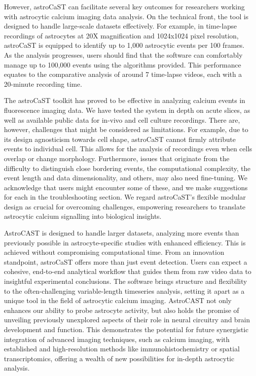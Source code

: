 However, \ac{astroCaST} can facilitate several key outcomes for researchers working with astrocytic calcium imaging data analysis. On the technical front, the tool is designed to handle large-scale datasets effectively. For example, in time-lapse recordings of astrocytes at 20X magnification and 1024x1024 pixel resolution, astroCaST is equipped to identify up to 1,000 astrocytic events per 100 frames. As the analysis progresses, users should find that the software can comfortably manage up to 100,000 events using the algorithms provided. This performance equates to the comparative analysis of around 7 time-lapse videos, each with a 20-minute recording time. 

The astroCaST toolkit has proved to be effective in analyzing calcium events in fluorescence imaging data. We have tested the system in depth on acute slices, as well as available public data for in-vivo and cell culture recordings. There are, however, challenges that might be considered as limitations. For example, due to its design agnosticism towards cell shape, astroCaST cannot firmly attribute events to individual cell. This allows for the analysis of recordings even when cells overlap or change morphology. Furthermore, issues that originate from the difficulty to distinguish close bordering events, the computational complexity, the event length and data dimensionality, and others, may also need fine-tuning. We acknowledge that users might encounter some of these, and we make suggestions for each in the troubleshooting section. We regard astroCaST's flexible modular design as crucial for overcoming challenges, empowering researchers to translate astrocytic calcium signalling into biological insights.

AstroCAST is designed to handle larger datasets, analyzing more events than previously possible in astrocyte-specific studies with enhanced efficiency. This is achieved without compromising computational time. From an innovation standpoint, astroCaST offers more than just event detection. Users can expect a cohesive, end-to-end analytical workflow that guides them from raw video data to insightful experimental conclusions. The software brings structure and flexibility to the often-challenging variable-length timeseries analysis, setting it apart as a unique tool in the field of astrocytic calcium imaging. AstroCAST not only enhances our ability to probe astrocyte activity, but also holds the promise of unveiling previously unexplored aspects of their role in neural circuitry and brain development and function. This demonstrates the potential for future synergistic integration of advanced imaging techniques, such as calcium imaging, with established and high-resolution methods like immunohistochemistry or spatial transcriptomics, offering a wealth of new possibilities for in-depth astrocytic analysis.